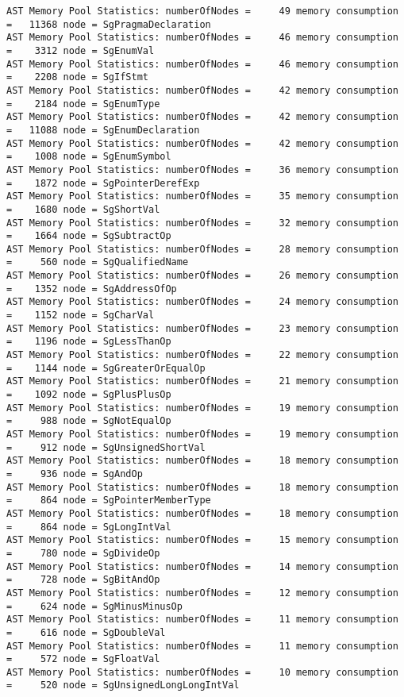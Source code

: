 {\begin{verbatim}
AST Memory Pool Statistics: numberOfNodes =     49 memory consumption =   11368 node = SgPragmaDeclaration
AST Memory Pool Statistics: numberOfNodes =     46 memory consumption =    3312 node = SgEnumVal
AST Memory Pool Statistics: numberOfNodes =     46 memory consumption =    2208 node = SgIfStmt
AST Memory Pool Statistics: numberOfNodes =     42 memory consumption =    2184 node = SgEnumType
AST Memory Pool Statistics: numberOfNodes =     42 memory consumption =   11088 node = SgEnumDeclaration
AST Memory Pool Statistics: numberOfNodes =     42 memory consumption =    1008 node = SgEnumSymbol
AST Memory Pool Statistics: numberOfNodes =     36 memory consumption =    1872 node = SgPointerDerefExp
AST Memory Pool Statistics: numberOfNodes =     35 memory consumption =    1680 node = SgShortVal
AST Memory Pool Statistics: numberOfNodes =     32 memory consumption =    1664 node = SgSubtractOp
AST Memory Pool Statistics: numberOfNodes =     28 memory consumption =     560 node = SgQualifiedName
AST Memory Pool Statistics: numberOfNodes =     26 memory consumption =    1352 node = SgAddressOfOp
AST Memory Pool Statistics: numberOfNodes =     24 memory consumption =    1152 node = SgCharVal
AST Memory Pool Statistics: numberOfNodes =     23 memory consumption =    1196 node = SgLessThanOp
AST Memory Pool Statistics: numberOfNodes =     22 memory consumption =    1144 node = SgGreaterOrEqualOp
AST Memory Pool Statistics: numberOfNodes =     21 memory consumption =    1092 node = SgPlusPlusOp
AST Memory Pool Statistics: numberOfNodes =     19 memory consumption =     988 node = SgNotEqualOp
AST Memory Pool Statistics: numberOfNodes =     19 memory consumption =     912 node = SgUnsignedShortVal
AST Memory Pool Statistics: numberOfNodes =     18 memory consumption =     936 node = SgAndOp
AST Memory Pool Statistics: numberOfNodes =     18 memory consumption =     864 node = SgPointerMemberType
AST Memory Pool Statistics: numberOfNodes =     18 memory consumption =     864 node = SgLongIntVal
AST Memory Pool Statistics: numberOfNodes =     15 memory consumption =     780 node = SgDivideOp
AST Memory Pool Statistics: numberOfNodes =     14 memory consumption =     728 node = SgBitAndOp
AST Memory Pool Statistics: numberOfNodes =     12 memory consumption =     624 node = SgMinusMinusOp
AST Memory Pool Statistics: numberOfNodes =     11 memory consumption =     616 node = SgDoubleVal
AST Memory Pool Statistics: numberOfNodes =     11 memory consumption =     572 node = SgFloatVal
AST Memory Pool Statistics: numberOfNodes =     10 memory consumption =     520 node = SgUnsignedLongLongIntVal

\end{verbatim}}
